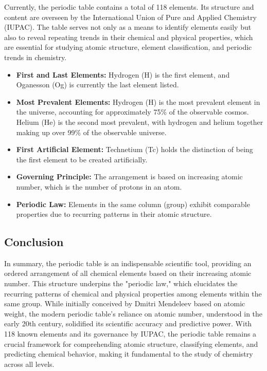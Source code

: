 \documentclass[12pt, a4paper]{article}
\begin{document}
Currently, the periodic table contains a total of 118 elements. Its structure and content are overseen by the International Union of Pure and Applied Chemistry (IUPAC). The table serves not only as a means to identify elements easily but also to reveal repeating trends in their chemical and physical properties, which are essential for studying atomic structure, element classification, and periodic trends in chemistry.

\begin{itemize}
 \item \textbf{First and Last Elements:} Hydrogen (H) is the first element, and Oganesson (Og) is currently the last element listed.
 \item \textbf{Most Prevalent Elements:} Hydrogen (H) is the most prevalent element in the universe, accounting for approximately 75\% of the observable cosmos. Helium (He) is the second most prevalent, with hydrogen and helium together making up over 99\% of the observable universe.
 \item \textbf{First Artificial Element:} Technetium (Tc) holds the distinction of being the first element to be created artificially.
 \item \textbf{Governing Principle:} The arrangement is based on increasing atomic number, which is the number of protons in an atom.
 \item \textbf{Periodic Law:} Elements in the same column (group) exhibit comparable properties due to recurring patterns in their atomic structure.
\end{itemize}

\subsection*{Conclusion}
In summary, the periodic table is an indispensable scientific tool, providing an ordered arrangement of all chemical elements based on their increasing atomic number. This structure underpins the "periodic law," which elucidates the recurring patterns of chemical and physical properties among elements within the same group. While initially conceived by Dmitri Mendeleev based on atomic weight, the modern periodic table's reliance on atomic number, understood in the early 20th century, solidified its scientific accuracy and predictive power. With 118 known elements and its governance by IUPAC, the periodic table remains a crucial framework for comprehending atomic structure, classifying elements, and predicting chemical behavior, making it fundamental to the study of chemistry across all levels.
\end{document}
